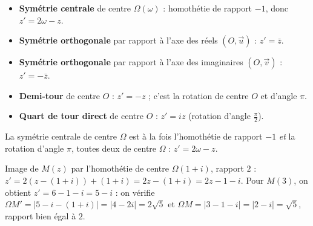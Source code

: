 \begin{propriete}
\begin{itemize}
\item \textbf{Symétrie centrale} de centre $\Omega(\omega)$ : homothétie de rapport $-1$, donc $z'=2\omega-z$.
\item \textbf{Symétrie orthogonale} par rapport à l'axe des réels $(O,\vec u)$ : $z'=\bar z$.
\item \textbf{Symétrie orthogonale} par rapport à l'axe des imaginaires $(O,\vec v)$ : $z'=-\bar z$.
\item \textbf{Demi-tour} de centre $O$ : $z'=-z$ ; c'est la rotation de centre $O$ et d'angle $\pi$.
\item \textbf{Quart de tour direct} de centre $O$ : $z'=iz$ (rotation d'angle $\frac\pi2$).
\end{itemize}
\end{propriete}

\begin{remarque}
La symétrie centrale de centre $\Omega$ est à la fois l'homothétie de rapport $-1$ \emph{et}
la rotation d'angle $\pi$, toutes deux de centre $\Omega$ : $z'=2\omega-z$.
\end{remarque}

\begin{illus}
\end{illus}

\begin{exemple}
Image de $M(z)$ par l'homothétie de centre $\Omega(1+i)$, rapport $2$ :
$z'=2(z-(1+i))+(1+i)=2z-(1+i)=2z-1-i$. Pour $M(3)$, on obtient $z'=6-1-i=5-i$ : on vérifie
$\Omega M'=|5-i-(1+i)|=|4-2i|=2\sqrt5$ et $\Omega M=|3-1-i|=|2-i|=\sqrt5$, rapport bien égal à $2$.
\end{exemple}


